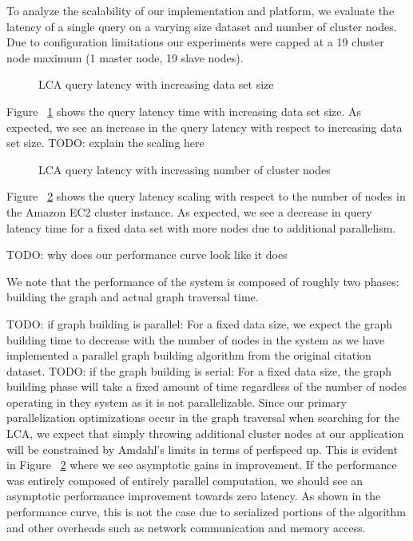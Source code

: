 \documentclass{article}
\begin{document}
To analyze the scalability of our implementation and platform, we evaluate the latency of a single query on a varying size dataset and number of cluster nodes.
Due to configuration limitations our experiments were capped at a 19 cluster node maximum (1 master node, 19 slave nodes).

\begin{figure}
\centering
\caption{LCA query latency with increasing data set size}
\label{latency_scaling}
\end{figure}

Figure ~\ref{latency_scaling} shows the query latency time with increasing data set size.
As expected, we see an increase in the query latency with respect to increasing data set size. 
TODO: explain the scaling here

\begin{figure}
\centering
\caption{LCA query latency with increasing number of cluster nodes}
\label{node_scaling}
\end{figure}

Figure ~\ref{node_scaling} shows the query latency scaling with respect to the number of nodes in the Amazon EC2 cluster instance.
As expected, we see a decrease in query latency time for a fixed data set with more nodes due to additional parallelism.


TODO: why does our performance curve look like it does

We note that the performance of the system is composed of roughly two phases: building the graph and actual graph traversal time.

TODO: if graph building is parallel: For a fixed data size, we expect the graph building time to decrease with the number of nodes in the system as we have implemented a parallel graph building algorithm from the original citation dataset.
TODO: if the graph building is serial: For a fixed data size, the graph building phase will take a fixed amount of time regardless of the number of nodes operating in they system as it is not parallelizable.
Since our primary parallelization optimizations occur in the graph traversal when searching for the LCA, we expect that simply throwing additional cluster nodes at our application will be constrained by Amdahl's limits in terms of  perfspeed up.
This is evident in Figure ~\ref{node_scaling} where we see asymptotic gains in improvement. 
If the performance was entirely composed of entirely parallel computation, we should see an asymptotic performance improvement towards zero latency.
As shown in the performance curve, this is not the case due to serialized portions of the algorithm and other overheads such as network communication and memory access.
\end{document}
